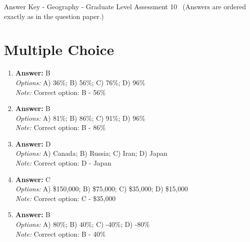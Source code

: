 \documentclass[12pt]{article}
\begin{document}
\begin{center}
Answer Key - Geography - Graduate Level Assessment 10 \
\small (Answers are ordered exactly as in the question paper.)
\end{center}

\section*{Multiple Choice}
\begin{enumerate}[label=\arabic*.]
\item \textbf{Answer:} B
\\ \textit{Options:} A) 36\%; B) 56\%; C) 76\%; D) 96\%
\\ \textit{Note:} Correct option: B - 56\%
\item \textbf{Answer:} B
\\ \textit{Options:} A) 81\%; B) 86\%; C) 91\%; D) 96\%
\\ \textit{Note:} Correct option: B - 86\%
\item \textbf{Answer:} D
\\ \textit{Options:} A) Canada; B) Russia; C) Iran; D) Japan
\\ \textit{Note:} Correct option: D - Japan
\item \textbf{Answer:} C
\\ \textit{Options:} A) \$150,000; B) \$75,000; C) \$35,000; D) \$15,000
\\ \textit{Note:} Correct option: C - \$35,000
\item \textbf{Answer:} B
\\ \textit{Options:} A) 80\%; B) 40\%; C) -40\%; D) -80\%
\\ \textit{Note:} Correct option: B - 40\%
\end{enumerate}
\end{document}
